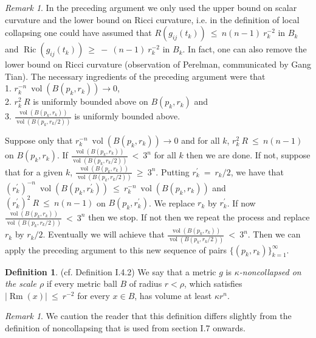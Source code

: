 \documentclass[12pt]{amsart}
\newcommand{\Ric}{\operatorname{Ric}}
\newcommand{\Rm}{\operatorname{Rm}}
\newcommand{\vol}{\operatorname{vol}}
\numberwithin{equation}{section}
\theoremstyle{plain}
\theoremstyle{definition}
\newtheorem{definition}[equation]{Definition}
\theoremstyle{remark}
\newtheorem{remark}[equation]{Remark}
\begin{document}
\begin{remark}
In the preceding argument we only used the upper bound on scalar
curvature and the lower bound on Ricci
curvature, i.e. in the definition
of local collapsing one could have assumed that
$R(g_{ij}(t_k)) \: \le \: n(n-1) \: r_k^{-2}$ in $B_k$ and
$\Ric(g_{ij}(t_k)) \: \ge \: - \: (n-1) \: r_k^{-2}$ in $B_k$.
In fact, one can also remove the lower bound on Ricci curvature
(observation of Perelman, communicated by Gang Tian).
The necessary ingredients of the preceding argument were that \\
1. $r_k^{-n} \: \vol(B(p_k, r_k)) \rightarrow 0$, \\
2. $r_k^2 \: R$ is uniformly bounded above on $B(p_k, r_k)$ and \\
3. $\frac{\vol(B(p_k, r_k))}{\vol(B(p_k, r_k/2))}$ is uniformly bounded above.

Suppose only that $r_k^{-n} \: \vol(B(p_k, r_k)) \rightarrow 0$ and 
for all $k$, $r_k^2 \: R \: \le \: n(n-1)$ on $B(p_k, r_k)$. If
$\frac{\vol(B(p_k, r_k))}{\vol(B(p_k, r_k/2))} \: < \: 3^n$ for all
$k$ then we are done.  If not, suppose that for a given $k$,
$\frac{\vol(B(p_k, r_k))}{\vol(B(p_k, r_k/2))} \: \ge \: 3^n$.
Putting $r_k^\prime \: = \: r_k/2$, we have that
$(r_k^\prime)^{-n} \: \vol(B(p_k, r_k^\prime)) \: \le \:
r_k^{-n} \: \vol(B(p_k, r_k))$ and 
$(r_k^\prime)^2 \: R \: \le \: n(n-1)$ on $B(p_k, r_k^\prime)$.
We replace $r_k$ by $r_k^\prime$. If now 
$\frac{\vol(B(p_k, r_k))}{\vol(B(p_k, r_k/2))} \: < \: 3^n$ then we
stop. If not then we repeat the process and replace $r_k$ by $r_k/2$.
Eventually we will achieve that 
$\frac{\vol(B(p_k, r_k))}{\vol(B(p_k, r_k/2))} \: < \: 3^n$.
Then we can apply the preceding argument to this new sequence of pairs
$\{(p_k, r_k)\}_{k=1}^\infty$.
\end{remark}

\begin{definition} \label{noncollapsed1} (cf. Definition I.4.2) 
We say that a metric $g$ is {\em $\kappa$-noncollapsed on the scale
$\rho$} if every metric ball $B$ of radius $r < \rho$, which satisfies
$|\Rm(x)| \: \le \: r^{-2}$ for every $x \in B$, has volume at least
$\kappa r^n$.
\end{definition}

\begin{remark}
We caution the reader that this definition differs slightly from the 
definition of noncollapsing that is used from section I.7 onwards.
\end{remark}
\end{document}
